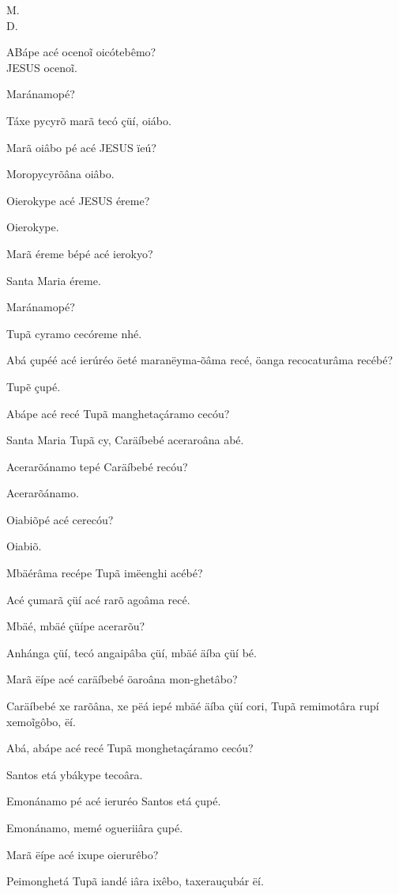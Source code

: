 \documentclass[openany,titlepage,12pt]{book}
\newcommand{\comecalista}[5]{
    \hspace*{-11.7pt}
    \begin{minipage}[t]{0.08\linewidth}
        \flushright #1\\#2
    \end{minipage}
    \hspace{0pt}
    \begin{minipage}[t]{0.94\linewidth}
        \lettrine
        [findent =2pt, nindent=0pt,  lines=2]
        {#3}{#4}#5
    \end{minipage}
    \vspace*{-3pt}
}
\begin{document}
\comecalista{M.}{D.}{A}{B}
    {ápe acé ocenoĩ oicótebêmo?\\
    JESUS ocenoĩ.}
\begin{alternate}
    \item Maránamopé?
    \item Táxe pycyrõ marã tecó çüí, oiábo.
    \item Marã oiâbo pé acé JESUS ïeú?
    \item Moropycyrõâna oiâbo.
    \item Oierokype acé JESUS éreme?
    \item Oierokype.
    \item Marã éreme bépé acé ierokyo?
    \item Santa Maria éreme.
    \item Maránamopé?
    \item Tupã cyramo cecóreme nhé.
    \item Abá çupéé acé ierúréo öeté maranëyma-õâma recé,
    öanga recocaturâma recébé?
    \item Tupẽ çupé.
\end{alternate}
\begin{alternate}[parsep=-5.4pt]
    \item Abápe acé recé Tupã manghetaçáramo cecóu?
    \item Santa Maria Tupã cy, Caräíbebé aceraroâna abé.
    \item Acerarõánamo tepé Caräíbebé recóu?
    \item Acerarõánamo.
    \item Oiabiõpé acé cerecóu?
    \item Oiabiõ.
    \item Mbäérâma recépe Tupã imëenghi acébé?
    \item Acé çumarã çüí acé rarõ agoâma recé.
    \item Mbäé, mbäé çüípe acerarõu?
    \item Anhánga çüí, tecó angaipâba çüí, mbäé äíba çüí bé.
    \item Marã ëípe acé caräíbebé öaroâna mon-ghetâbo?
    \item Caräíbebé xe rarõâna, xe pëá iepé mbäé äíba çüí
    cori, Tupã remimotâra rupí xe\linebreak moĩgôbo, ëí.
    \item Abá, abápe acé recé Tupã monghetaçáramo cecóu?
    \item Santos etá ybákype tecoâra.
    \item Emonánamo pé acé ieruréo Santos etá çupé.
    \item Emonánamo, memé ogueriiâra çupé.
    \item Marã ëípe acé ixupe oierurêbo?
    \item Peimonghetá Tupã iandé iâra ixêbo, taxerauçubár ëí.
\end{alternate}
\end{document}
